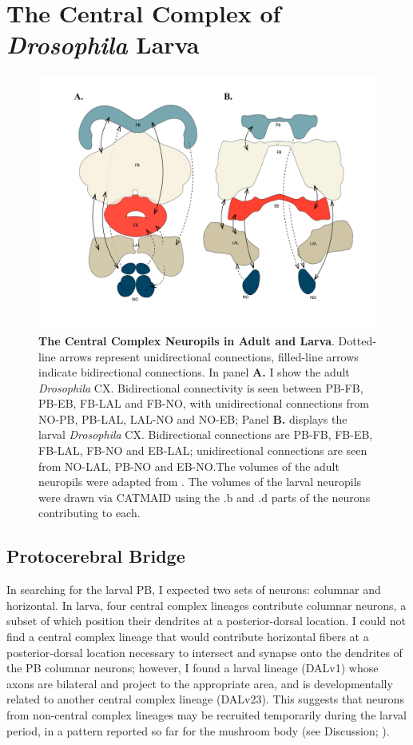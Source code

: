 \section{The Central Complex of \textit{Drosophila} Larva}
\label{CXLarva}
    \begin{figure}[H]
        \centering
        \includegraphics[width=12cm]{Figs/CX/cxdiagram.pdf}
        \caption[The Central Complex Neuropils in Adult and Larva]{\textbf{The Central Complex Neuropils in Adult and Larva}. Dotted-line arrows represent unidirectional connections, filled-line arrows indicate bidirectional connections. In panel \textbf{A.} I show the adult \textit{\textit{Drosophila}} CX. Bidirectional connectivity is seen between PB-FB, PB-EB, FB-LAL and FB-NO, with unidirectional connections from NO-PB, PB-LAL, LAL-NO and NO-EB; Panel \textbf{B.} displays the larval \textit{Drosophila} CX. Bidirectional connections are  PB-FB, FB-EB, FB-LAL, FB-NO and EB-LAL; unidirectional connections are seen from NO-LAL, PB-NO and EB-NO.The volumes of the adult neuropils were adapted from \citep{franconville2018building}.
        The volumes of the larval neuropils were drawn via CATMAID using the .b and .d parts of the neurons contributing to each.}
        \label{cxdiagram}
    \end{figure}

    \subsection{Protocerebral Bridge}
    \label{PB}
        In searching for the larval PB, I expected two sets of neurons: columnar and horizontal. In larva, four central complex lineages contribute columnar neurons, a subset of which position their dendrites at a posterior-dorsal location. I could not find a central complex lineage that would contribute horizontal fibers at a posterior-dorsal location necessary to intersect and synapse onto the dendrites of the PB columnar neurons; however, I found a larval lineage (DALv1) whose axons are bilateral and project to the appropriate area, and is developmentally related to another central complex lineage (DALv23). This suggests that neurons from non-central complex lineages may be recruited temporarily during the larval period, in a pattern reported so far for the mushroom body (see Discussion; \citep{truman2023metamorphosis}). 

